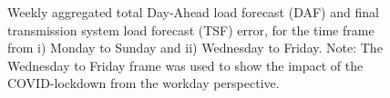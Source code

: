 \documentclass[energies,article,submit,moreauthors,pdftex]{Definitions/mdpi}
\begin{document}



\begin{figure}[!tbp]
  \centering
  \hfill
  \caption{Weekly aggregated total Day-Ahead load forecast (DAF) and final transmission system load forecast (TSF) error, for the time frame from i) Monday to Sunday and ii) Wednesday to Friday. Note: The Wednesday to Friday frame was used to show the impact of the COVID-lockdown from the workday perspective.}
  \label{fig:DAFandTSFerror}
\end{figure}
\end{document}
